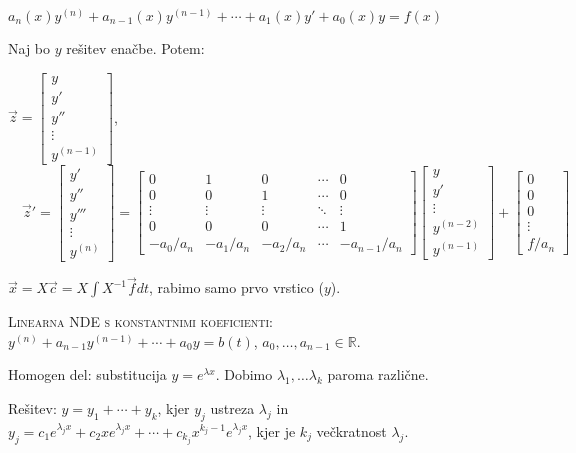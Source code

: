 \documentclass[8pt,a4paper]{amsart}
\theoremstyle{definition} %
\theoremstyle{plain} %
\let\oldint\int
\renewcommand{\int}{\oldint \!}
\newcommand{\R}{\mathbb R}
\begin{document}
$a_n(x)y^{(n)}+a_{n-1}(x)y^{(n-1)}+\cdots + a_1(x)y' + a_0(x)y = f(x)$

Naj bo $y$ rešitev enačbe. Potem:

$\vec{z} = \begin{bmatrix} y \\ y' \\ y'' \\ \vdots \\ y^{(n-1)} \end{bmatrix}$,
$ \quad \vec{z}' =  \begin{bmatrix} y' \\ y'' \\ y''' \\ \vdots \\ y^{(n)} \end{bmatrix}
=
\begin{bmatrix}
  0 & 1 & 0 &  \cdots & 0 \\
  0 & 0 & 1 &  \cdots & 0 \\
  \vdots & \vdots & \vdots & \ddots & \vdots \\
  0 & 0 & 0 &  \cdots & 1 \\
  -a_0/a_n & -a_1/a_n  & -a_2/a_n  & \cdots & -a_{n-1}/a_n 
\end{bmatrix}
\begin{bmatrix} y \\ y' \\ \vdots \\ y^{(n-2)} \\ y^{(n-1)} \end{bmatrix}
+
\begin{bmatrix} 0 \\ 0 \\ 0 \\ \vdots \\ f/a_n  \end{bmatrix}$

$\vec{x} = X\vec{c} = X \int X^{-1}\vec{f}dt$, rabimo samo prvo vrstico ($y$).

\textsc{Linearna NDE s konstantnimi koeficienti:}
$y^{(n)}+a_{n-1}y^{(n-1)}+\cdots + a_0y = b(t)$, $a_0,\ldots ,a_{n-1} \in \R$.

Homogen del: substitucija $y = e^{\lambda x}$. Dobimo $\lambda_1, \ldots \lambda_k$ paroma
različne.

\hspace{3em} Rešitev: $y = y_1+\cdots +y_k$, kjer $y_j$ ustreza $\lambda_j$ in $y_j = c_1
e^{\lambda_j x}+c_2 x e^{\lambda_j x}+\cdots + c_{k_j} x^{k_j -1} e^{\lambda_j
x}$, kjer je $k_j$ večkratnost $\lambda_j$.
\end{document}
